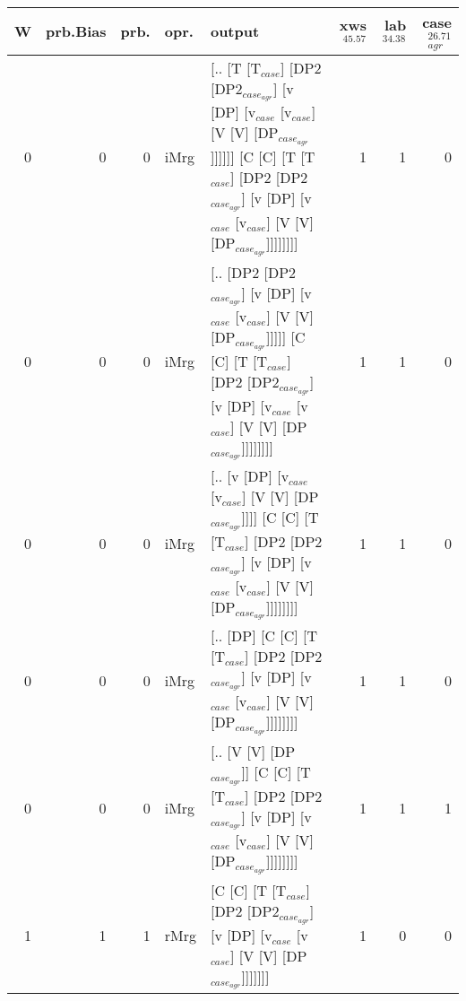 \begin{tabularx}{\linewidth}{rrrlXrrr}
\hline
   W &   prb.Bias &   prb. & opr.   & output                                                                                                                                                                             &   xws$^{45.57}$ &   lab$^{34.38}$ &   case$_{agr}^{26.71}$ \\
\hline
   0 &       0 &   0 & iMrg & [.. [T [T$_{case}$] [DP2 [DP2$_{case_{agr}}$] [v [DP] [v$_{case}$ [v$_{case}$] [V [V] [DP$_{case_{agr}}$]]]]]] [C [C] [T [T$_{case}$] [DP2 [DP2$_{case_{agr}}$] [v [DP] [v$_{case}$ [v$_{case}$] [V [V] [DP$_{case_{agr}}$]]]]]]]] &             1 &             1 &                  0 \\
   0 &       0 &   0 & iMrg & [.. [DP2 [DP2$_{case_{agr}}$] [v [DP] [v$_{case}$ [v$_{case}$] [V [V] [DP$_{case_{agr}}$]]]]] [C [C] [T [T$_{case}$] [DP2 [DP2$_{case_{agr}}$] [v [DP] [v$_{case}$ [v$_{case}$] [V [V] [DP$_{case_{agr}}$]]]]]]]]              &             1 &             1 &                  0 \\
   0 &       0 &   0 & iMrg & [.. [v [DP] [v$_{case}$ [v$_{case}$] [V [V] [DP$_{case_{agr}}$]]]] [C [C] [T [T$_{case}$] [DP2 [DP2$_{case_{agr}}$] [v [DP] [v$_{case}$ [v$_{case}$] [V [V] [DP$_{case_{agr}}$]]]]]]]]                                   &             1 &             1 &                  0 \\
   0 &       0 &   0 & iMrg & [.. [DP] [C [C] [T [T$_{case}$] [DP2 [DP2$_{case_{agr}}$] [v [DP] [v$_{case}$ [v$_{case}$] [V [V] [DP$_{case_{agr}}$]]]]]]]]                                                                               &             1 &             1 &                  0 \\
   0 &       0 &   0 & iMrg & [.. [V [V] [DP$_{case_{agr}}$]] [C [C] [T [T$_{case}$] [DP2 [DP2$_{case_{agr}}$] [v [DP] [v$_{case}$ [v$_{case}$] [V [V] [DP$_{case_{agr}}$]]]]]]]]                                                              &             1 &             1 &                  1 \\
   1 &       1 &   1 & rMrg & [C [C] [T [T$_{case}$] [DP2 [DP2$_{case_{agr}}$] [v [DP] [v$_{case}$ [v$_{case}$] [V [V] [DP$_{case_{agr}}$]]]]]]]                                                                                         &             1 &             0 &                  0 \\
\hline
\end{tabularx}\endgroup\\
